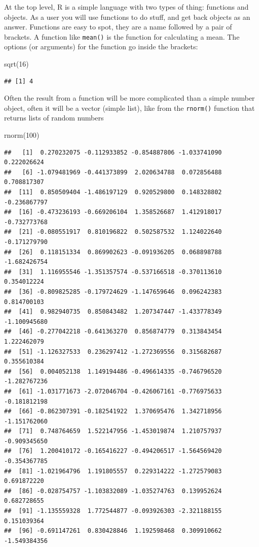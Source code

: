 \documentclass[
]{book}
\newenvironment{Shaded}{\begin{snugshade}}{\end{snugshade}}
\newcommand{\DecValTok}[1]{\textcolor[rgb]{0.00,0.00,0.81}{#1}}
\newcommand{\FunctionTok}[1]{\textcolor[rgb]{0.00,0.00,0.00}{#1}}
\newcommand{\NormalTok}[1]{#1}
\begin{document}
At the top level, R is a simple language with two types of thing: functions and objects. As a user you will use functions to do stuff, and get back objects as an answer. Functions are easy to spot, they are a name followed by a pair of brackets. A function like \texttt{mean()} is the function for calculating a mean. The options (or arguments) for the function go inside the brackets:

\begin{Shaded}
\begin{Highlighting}[]
\FunctionTok{sqrt}\NormalTok{(}\DecValTok{16}\NormalTok{)}
\end{Highlighting}
\end{Shaded}

\begin{verbatim}
## [1] 4
\end{verbatim}

Often the result from a function will be more complicated than a simple number object, often it will be a vector (simple list), like from the \texttt{rnorm()} function that returns lists of random numbers

\begin{Shaded}
\begin{Highlighting}[]
\FunctionTok{rnorm}\NormalTok{(}\DecValTok{100}\NormalTok{)}
\end{Highlighting}
\end{Shaded}

\begin{verbatim}
##   [1]  0.270232075 -0.112933852 -0.854887806 -1.033741090  0.222026624
##   [6] -1.079481969 -0.441373899  2.020634788  0.072856488  0.708817307
##  [11]  0.850509404 -1.486197129  0.920529800  0.148328802 -0.236867797
##  [16] -0.473236193 -0.669206104  1.358526687  1.412918017 -0.732773768
##  [21] -0.080551917  0.810196822  0.502587532  1.124022640 -0.171279790
##  [26]  0.118151334  0.869902623 -0.091936205  0.068898788 -1.682426754
##  [31]  1.116955546 -1.351357574 -0.537166518 -0.370113610  0.354012224
##  [36] -0.809825285 -0.179724629 -1.147659646  0.096242383  0.814700103
##  [41]  0.982940735  0.850843482  1.207347447 -1.433778349 -1.100945680
##  [46] -0.277042218 -0.641363270  0.856874779  0.313843454  1.222462079
##  [51] -1.126327533  0.236297412 -1.272369556  0.315682687  0.355610384
##  [56]  0.004052138  1.149194486 -0.496614335 -0.746796520 -1.282767236
##  [61] -1.031771673 -2.072046704 -0.426067161 -0.776975633 -0.181812198
##  [66] -0.862307391 -0.182541922  1.370695476  1.342718956 -1.151762060
##  [71]  0.748764659  1.522147956 -1.453019874  1.210757937 -0.909345650
##  [76]  1.200410172 -0.165416227 -0.494206517 -1.564569420 -0.354367785
##  [81] -1.021964796  1.191805557  0.229314222 -1.272579083  0.691872220
##  [86] -0.028754757 -1.103832089 -1.035274763  0.139952624  0.682728655
##  [91] -1.135559328  1.772544877 -0.093926303 -2.321188155  0.151039364
##  [96] -0.691147261  0.830428846  1.192598468  0.309910662 -1.549384356
\end{verbatim}
\end{document}
